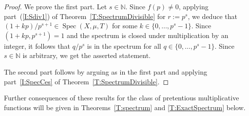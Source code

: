 \documentclass[11pt]{amsart}
\theoremstyle{definition}
\newtheorem*{remark}{Remark}
\newcommand{\N}{{\mathbb N}}
\DeclareMathOperator{\spec}{Spec}
\begin{document}
 \begin{proof}
 	We prove the first part.
 	Let $s\in \N$. Since $f(p)\neq 0$, applying part~(\ref{I:Sdiv1}) of Theorem~\ref{T:SpectrumDivisible} for $r:=p^{s}$, we deduce that $(1+kp)/p^{s+1}\in \spec(X,\mu,T)$ for some $k\in \{0,\ldots, p^{s}-1\}$. Since $(1+kp,p^{s+1})=1$ and the spectrum is closed under multiplication by an integer, it follows that
 	$q/p^{s}$ is in the spectrum for all $q\in \{0,\ldots, p^{s}-1\}$. Since $s\in \N$ is arbitrary, we get the asserted statement.
 	
 	The second part follows by arguing as in the first part and applying part~\eqref{I:SpecCes} of Theorem~\ref{T:SpectrumDivisible}.
 \end{proof}

 Further consequences of these results for the class of pretentious multiplicative functions will be given in Theorems~\ref{T:spectrum}  and \ref{T:ExactSpectrum}   below.
\end{document}

